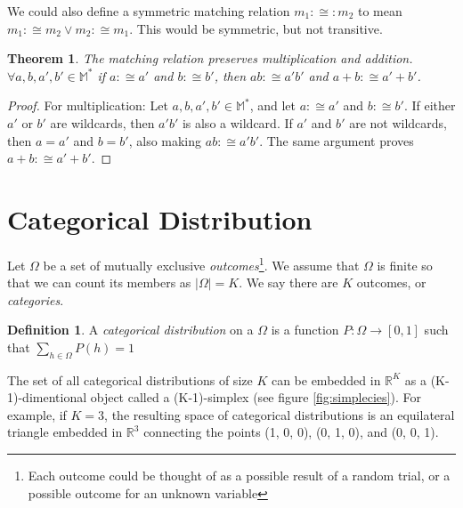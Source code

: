 \documentclass[twoside]{article}
\theoremstyle{plain}%
\newtheorem{theorem}{Theorem}[section]
\theoremstyle{definition}
\newtheorem{definition}{Definition}[section]
\theoremstyle{remark}
\begin{document}
We could also define a symmetric matching relation \(m_1 :\cong: m_2\) to mean \(m_1 :\cong m_2 \vee m_2 :\cong m_1\). This would be symmetric, but not transitive.

\begin{theorem}
\label{theorem:matching_multiplication}
The matching relation preserves multiplication and addition. \(\forall a,b,a',b' \in \mathbb{M^*}\) if \(a :\cong a'\) and \(b :\cong b'\), then \(ab :\cong a'b'\) and \(a+b :\cong a'+b'\).
\end{theorem}

\begin{proof}
For multiplication: Let \(a,b,a',b' \in \mathbb{M^*}\), and let \(a :\cong a'\) and \(b :\cong b'\). If either \(a'\) or \(b'\) are wildcards, then \(a'b'\) is also a wildcard. If \(a'\) and \(b'\) are not wildcards, then \(a = a'\) and \(b = b'\), also making \(ab :\cong a'b'\).
The same argument proves \(a+b :\cong a'+b'\).
\end{proof}

\section{Categorical Distribution}

Let \(\Omega\) be a set of mutually exclusive \textit{outcomes}\footnote{Each outcome could be thought of as a possible result of a random trial, or a possible outcome for an unknown variable}. We assume that \(\Omega\) is finite so that we can count its members as \(|\Omega| = K\). We say there are \(K\) outcomes, or \textit{categories}.

\begin{definition}
\label{def:categorical_abs}
A \textit{categorical distribution} on a \(\Omega\) is a function \(P: \Omega \rightarrow [0, 1]\) such that \(\sum_{h \in \Omega} P(h) = 1\)
\end{definition}

The set of all categorical distributions of size \(K\) can be embedded in \(\mathbb{R}^K\) as a (K-1)-dimentional object called a (K-1)-simplex (see figure \ref{fig:simplecies}). For example, if \(K = 3\), the resulting space of categorical distributions is an equilateral triangle embedded in \(\mathbb{R}^3\) connecting the points (1, 0, 0), (0, 1, 0), and (0, 0, 1).
\end{document}
